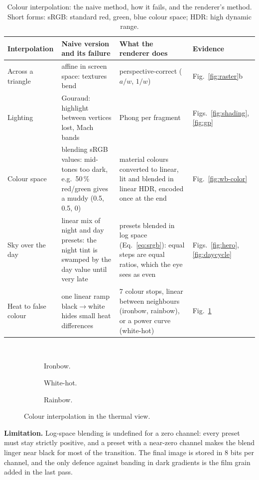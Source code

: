 \begin{table}[htbp]
\caption{Colour interpolation: the naive method, how it fails, and the renderer's method. Short forms: sRGB: standard red, green, blue colour space; HDR: high dynamic range.}
\centering\small
\begin{tabularx}{\linewidth}{@{}lXXl@{}}
\toprule
Interpolation & Naive version and its failure & What the renderer does & Evidence\\\midrule
Across a triangle & affine in screen space: textures bend & perspective-correct ($a/w$, $1/w$) & Fig.~\ref{fig:raster}b\\
Lighting & Gouraud: highlight between vertices lost, Mach bands & Phong per fragment & Figs.~\ref{fig:shading}, \ref{fig:gp}\\
Colour space & blending sRGB values: mid-tones too dark, e.g.\ 50\,\% red/green gives a muddy (0.5, 0.5, 0) & material colours converted to linear, lit and blended in linear HDR, encoded once at the end & Fig.~\ref{fig:wb-color}\\
Sky over the day & linear mix of night and day presets: the night tint is swamped by the day value until very late & presets blended in log space (Eq.~\eqref{eq:srgb}): equal steps are equal ratios, which the eye sees as even & Figs.~\ref{fig:hero}, \ref{fig:daycycle}\\
Heat to false colour & one linear ramp black$\to$white hides small heat differences & 7 colour stops, linear between neighbours (ironbow, rainbow), or a power curve (white-hot) & Fig.~\ref{fig:palettes}\\
\bottomrule
\end{tabularx}
\end{table}

\begin{figure}[htbp]
\centering
{}\\[1.5mm]
\begin{subfigure}[t]{0.325\linewidth}\caption{Ironbow.}\end{subfigure}\hfill
\begin{subfigure}[t]{0.325\linewidth}\caption{White-hot.}\end{subfigure}\hfill
\begin{subfigure}[t]{0.325\linewidth}\caption{Rainbow.}\end{subfigure}
\caption{Colour interpolation in the thermal view.}
\label{fig:palettes}
\end{figure}

\textbf{Limitation.} Log-space blending is undefined for a zero channel: every preset must stay strictly positive,
and a preset with a near-zero channel makes the blend linger near black for most of the transition. The final image
is stored in 8 bits per channel, and the only defence against banding in dark gradients is the film grain added in
the last pass.
